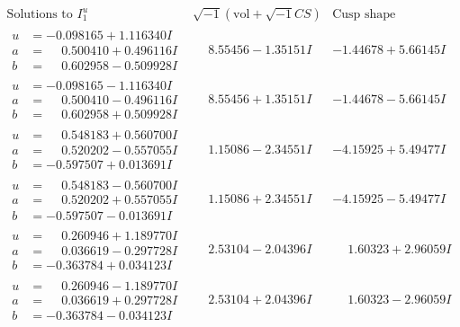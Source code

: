 \documentclass[1p]{elsarticle_modified}
\theoremstyle{definition}
\newcommand{\I}{\sqrt{-1}}
\begin{document}
$$\begin{array}{c|c|c}  
\text{Solutions to }I^u_{1}& \I (\text{vol} + \sqrt{-1}CS) & \text{Cusp shape}\\
 \hline 
\begin{aligned}
u &= -0.098165 + 1.116340 I \\
a &= \phantom{-}0.500410 + 0.496116 I \\
b &= \phantom{-}0.602958 - 0.509928 I\end{aligned}
 & \phantom{-}8.55456 - 1.35151 I & -1.44678 + 5.66145 I \\ \hline\begin{aligned}
u &= -0.098165 - 1.116340 I \\
a &= \phantom{-}0.500410 - 0.496116 I \\
b &= \phantom{-}0.602958 + 0.509928 I\end{aligned}
 & \phantom{-}8.55456 + 1.35151 I & -1.44678 - 5.66145 I \\ \hline\begin{aligned}
u &= \phantom{-}0.548183 + 0.560700 I \\
a &= \phantom{-}0.520202 - 0.557055 I \\
b &= -0.597507 + 0.013691 I\end{aligned}
 & \phantom{-}1.15086 - 2.34551 I & -4.15925 + 5.49477 I \\ \hline\begin{aligned}
u &= \phantom{-}0.548183 - 0.560700 I \\
a &= \phantom{-}0.520202 + 0.557055 I \\
b &= -0.597507 - 0.013691 I\end{aligned}
 & \phantom{-}1.15086 + 2.34551 I & -4.15925 - 5.49477 I \\ \hline\begin{aligned}
u &= \phantom{-}0.260946 + 1.189770 I \\
a &= \phantom{-}0.036619 - 0.297728 I \\
b &= -0.363784 + 0.034123 I\end{aligned}
 & \phantom{-}2.53104 - 2.04396 I & \phantom{-}1.60323 + 2.96059 I \\ \hline\begin{aligned}
u &= \phantom{-}0.260946 - 1.189770 I \\
a &= \phantom{-}0.036619 + 0.297728 I \\
b &= -0.363784 - 0.034123 I\end{aligned}
 & \phantom{-}2.53104 + 2.04396 I & \phantom{-}1.60323 - 2.96059 I \\ \hline\begin{aligned}

\end{aligned}
\end{array}$$
\end{document}
